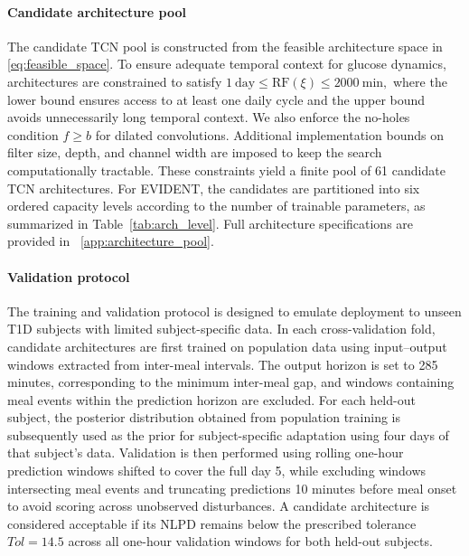 \documentclass[preprint,12pt]{elsarticle}
\begin{document}
\paragraph{Candidate architecture pool}
The candidate TCN pool is constructed from the feasible architecture space in \eqref{eq:feasible_space}. To ensure adequate temporal context for glucose dynamics, architectures are constrained to satisfy
$
1~\text{day} \le \mathrm{RF}(\xi) \le 2000~\text{min},
$
where the lower bound ensures access to at least one daily cycle and the upper bound avoids unnecessarily long temporal context. We also enforce the no-holes condition \(f\geq b\) for dilated convolutions. Additional implementation bounds on filter size, depth, and channel width are imposed to keep the search computationally tractable. These constraints yield a finite pool of 61 candidate TCN architectures. For EVIDENT, the candidates are partitioned into six ordered capacity levels according to the number of trainable parameters, as summarized in Table~\ref{tab:arch_level}. Full architecture specifications are provided in ~\ref{app:architecture_pool}.

\paragraph{Validation protocol}
The training and validation protocol is designed to emulate deployment to unseen T1D subjects with limited subject-specific data. In each cross-validation fold, candidate architectures are first trained on population data using input--output windows extracted from inter-meal intervals. The output horizon is set to 285 minutes, corresponding to the minimum inter-meal gap, and windows containing meal events within the prediction horizon are excluded.
%
For each held-out subject, the posterior distribution obtained from population training is subsequently used as the prior for subject-specific adaptation using four days of that subject’s data. Validation is then performed using rolling one-hour prediction windows  shifted to cover the full day 5, while excluding windows intersecting meal events and truncating predictions 10 minutes before meal onset to avoid scoring across unobserved disturbances. A candidate architecture is considered acceptable if its NLPD remains below the prescribed tolerance \(Tol=14.5\) across all one-hour validation windows for both held-out subjects.
\end{document}
